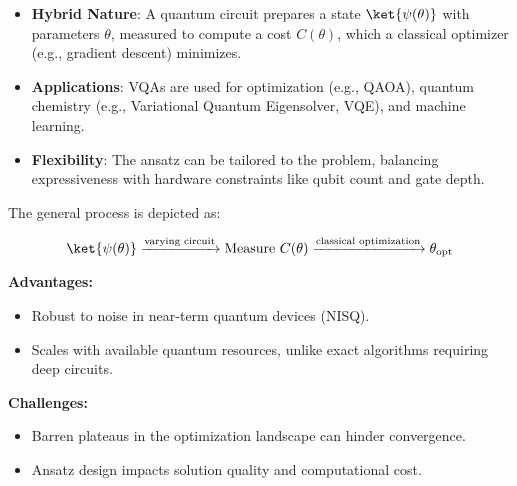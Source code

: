 \begin{itemize}
  \item \textbf{Hybrid Nature}: A quantum circuit prepares a state
    $\ket{\psi(\theta)}$ with parameters $\theta$, measured to compute a cost
    $C(\theta)$, which a classical optimizer (e.g., gradient descent) minimizes.

  \item \textbf{Applications}: VQAs are used for optimization (e.g., QAOA),
    quantum chemistry (e.g., Variational Quantum Eigensolver, VQE), and
    machine learning.

  \item \textbf{Flexibility}: The ansatz can be tailored to the problem,
    balancing expressiveness with hardware constraints like qubit count and
    gate depth.
\end{itemize}

The general process is depicted as:

\[
  \ket{\psi(\theta)} \xrightarrow{\text{varying circuit}} \text{Measure }
  C(\theta) \xrightarrow{\text{classical optimization}} \theta_{\text{opt}}
\]

\textbf{Advantages:}
\begin{itemize}
  \item Robust to noise in near-term quantum devices (NISQ).

  \item Scales with available quantum resources, unlike exact algorithms
    requiring deep circuits.
\end{itemize}

\textbf{Challenges:}
\begin{itemize}
  \item Barren plateaus in the optimization landscape can hinder convergence.

  \item Ansatz design impacts solution quality and computational cost.

\end{itemize}

